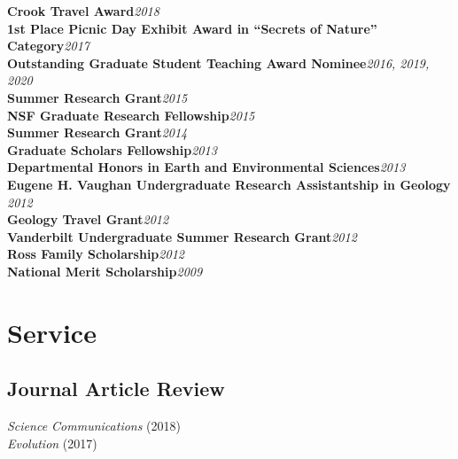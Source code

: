 \documentclass[12pt]{article}
\begin{document}
\textbf{Crook Travel Award}\hfill \emph{2018}\\
\textbf{1st Place Picnic Day Exhibit Award in “Secrets of Nature” Category}\hfill \emph{2017}\\
\textbf{Outstanding Graduate Student Teaching Award Nominee}\hfill \emph{2016, 2019, 2020}\\
\textbf{Summer Research Grant}\hfill \emph{2015}\\
\textbf{NSF Graduate Research Fellowship}\hfill \emph{2015}\\
\textbf{Summer Research Grant}\hfill \emph{2014}\\
\textbf{Graduate Scholars Fellowship}\hfill \emph{2013}\\
\textbf{Departmental Honors in Earth and Environmental Sciences}\hfill \emph{2013}\\
\textbf{Eugene H. Vaughan Undergraduate Research Assistantship in Geology }\hfill \emph{2012}\\
\textbf{Geology Travel Grant}\hfill \emph{2012}\\
\textbf{Vanderbilt Undergraduate Summer Research Grant}\hfill \emph{2012}\\
\textbf{Ross Family Scholarship}\hfill \emph{2012}\\
\textbf{National Merit Scholarship}\hfill \emph{2009}\\


\vspace{-0.35em}

\section{Service}

\subsection{Journal Article Review}

\emph{Science Communications} (2018)\\
\emph{Evolution} (2017)
\end{document}
